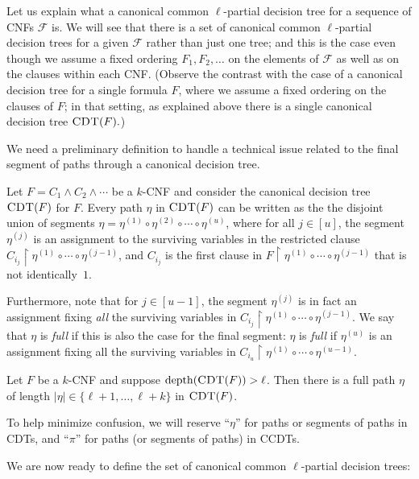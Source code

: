 \documentclass{toc}
\theoremstyle{plain}
\newcommand{\uhr}{\upharpoonright}
\newcommand{\CDT}{\textsc{CDT}}
\newcommand{\depth}{\mathrm{depth}}
\begin{document}
Let us  explain what a canonical common $\ell$-partial decision tree for a {sequence} of CNFs $\mathscr{F}$ is. We will see that there is a set of canonical common $\ell$-partial decision trees for a given $\mathscr{F}$ rather than just one tree; and this is the case even though we assume a fixed ordering $F_1,F_2,\dots$ on the elements of $\mathscr{F}$ as well as on the clauses within each CNF.  (Observe the contrast with the case of a canonical decision tree for a single formula $F$, where we assume a fixed ordering on the clauses of $F$; in that setting, as explained above there is a single canonical decision tree $\CDT(F).$)

We need a preliminary definition to handle a technical issue related to the final segment of paths through a canonical decision tree.

\begin{definition}
\label{def:full}
Let $F = C_1 \wedge C_2 \wedge \cdots$ be a $k$-CNF and consider the canonical decision tree $\CDT(F)$ for $F$. Every path $\eta$ in $\CDT(F)$ can be written as the the disjoint union of segments $\eta = \eta^{(1)} \circ \eta^{(2)} \circ \cdots \circ \eta^{(u)}$,  where for all $j\in [u]$, the segment $\eta^{(j)}$ is an assignment to the surviving variables in the restricted clause $C_{i_j} \uhr \eta^{(1)} \circ \cdots \circ \eta^{(j-1)}$, and $C_{i_j}$ is the first clause in $F \uhr \eta^{(1)} \circ \cdots \circ \eta^{(j-1)}$ that is not identically~$1$.

Furthermore, note that for $j\in [u-1]$, the segment $\eta^{(j)}$ is in fact an assignment fixing \emph{all} the surviving variables in $C_{i_j} \uhr \eta^{(1)} \circ \cdots \circ \eta^{(j-1)}$.  We say that $\eta$ is \emph{full} if this is also the case for the final segment: $\eta$ is \emph{full} if $\eta^{(u)}$ is an assignment fixing all the surviving variables in $C_{i_u} \uhr \eta^{(1)} \circ \cdots \circ \eta^{(u-1)}$. 
\end{definition} 

\begin{observation}
Let $F$ be a $k$-CNF and suppose $\depth(\CDT(F)) > \ell$. Then there is a full path $\eta$ of length $|\eta| \in \{\ell+1,\ldots,\ell+k\}$ in $\CDT(F)$. 
\end{observation} 


To help minimize confusion, we will reserve ``$\eta$'' for paths or segments of paths in CDTs, and ``$\pi$'' for paths (or segments of paths) in CCDTs.

We are now ready to define the set of canonical common $\ell$-partial decision trees:
\end{document}
